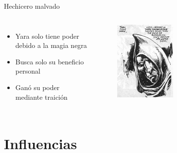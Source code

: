 \begin{frame}{Hechicero malvado}
\begin{columns}
 \begin{itemize}
    \item Yara solo tiene poder debido a la magia negra
    \item Busca solo su beneficio personal
    \item Ganó su poder mediante traición
 \end{itemize}
    \begin{figure}[htb]
      \centering
      \includegraphics[width=0.5\textwidth]{img/tropes/malvado}
    \end{figure}
  \end{columns}
\end{frame}
\note[itemize]{
	\item
}

\section{Influencias}
\note[itemize]{
	\item
}

